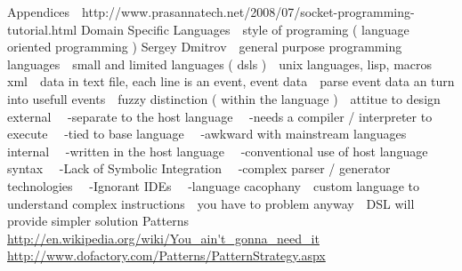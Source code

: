 Appendices
\newline 
http://www.prasannatech.net/2008/07/socket-programming-tutorial.html
Domain Specific Languages
\newline 
style of programing ( language oriented programming ) Sergey Dmitrov %
\newline 
general purpose programming languages
\newline 
small and limited languages ( dsls )
\newline 
unix languages, lisp, macros
\newline 
xml
\newline 
data in text file, each line is an event, event data
\newline 
parse event data an turn into usefull events %
\newline 
fuzzy distinction ( within the language )
\newline 
attitue to design
\newline 
external
\newline 
 -separate to the host language
\newline 
 -needs a compiler / interpreter to execute
\newline 
 -tied to base language
\newline 
 -awkward with mainstream { languages }
\newline 
internal
\newline 
 -written in the host language
\newline 
 -conventional use of host language syntax
\newline 
 -Lack of Symbolic Integration
\newline 
 -complex parser / generator technologies
\newline 
 -Ignorant IDEs
\newline 
 -language cacophany
\newline 
custom language to understand complex instructions
\newline 
you have to problem anyway
\newline 
DSL will provide simpler solution Patterns
\newline 
\url{http://en.wikipedia.org/wiki/You_ain't_gonna_need_it}
\newline 
\url{http://www.dofactory.com/Patterns/PatternStrategy.aspx}
\newline 
